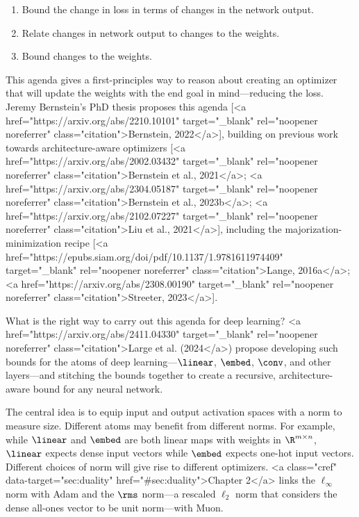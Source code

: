 \begin{enumerate}
    \item Bound the change in loss in terms of changes in the network output.
    \item Relate changes in network output to changes to the weights.
    \item Bound changes to the weights.
\end{enumerate}

This agenda gives a first-principles way to reason about creating an optimizer that will update the weights with the end goal in mind---reducing the loss. Jeremy Bernstein's PhD thesis proposes this agenda [<a href="https://arxiv.org/abs/2210.10101" target="_blank" rel="noopener noreferrer" class="citation">Bernstein, 2022</a>], building on previous work towards architecture-aware optimizers [<a href="https://arxiv.org/abs/2002.03432" target="_blank" rel="noopener noreferrer" class="citation">Bernstein et al., 2021</a>; <a href="https://arxiv.org/abs/2304.05187" target="_blank" rel="noopener noreferrer" class="citation">Bernstein et al., 2023b</a>; <a href="https://arxiv.org/abs/2102.07227" target="_blank" rel="noopener noreferrer" class="citation">Liu et al., 2021</a>], including the majorization-minimization recipe [<a href="https://epubs.siam.org/doi/pdf/10.1137/1.9781611974409" target="_blank" rel="noopener noreferrer" class="citation">Lange, 2016a</a>; <a href="https://arxiv.org/abs/2308.00190" target="_blank" rel="noopener noreferrer" class="citation">Streeter, 2023</a>].


What is the right way to carry out this agenda for deep learning? <a href="https://arxiv.org/abs/2411.04330" target="_blank" rel="noopener noreferrer" class="citation">Large et al. (2024</a>) propose developing such bounds for the atoms of deep learning---$\linear$, $\embed$, $\conv$, and other layers---and stitching the bounds together to create a recursive, architecture-aware bound for any neural network.

The central idea is to equip input and output activation spaces with a norm to measure size. Different atoms may benefit from different norms. For example, while $\linear$ and $\embed$ are both linear maps with weights in $\R^{m \times n}$, $\linear$ expects dense input vectors while $\embed$ expects one-hot input vectors. Different choices of norm will give rise to different optimizers. <a class="cref" data-target="sec:duality" href="#sec:duality">Chapter 2</a> links the $\ell_\infty$ norm with Adam and the $\rms$ norm---a rescaled $\ell_2$ norm that considers the dense all-ones vector to be unit norm---with Muon.

